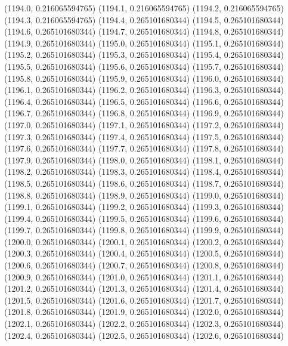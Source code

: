 {					(1194.0, 0.216065594765)
					(1194.1, 0.216065594765)
					(1194.2, 0.216065594765)
					(1194.3, 0.216065594765)
					(1194.4, 0.265101680344)
					(1194.5, 0.265101680344)
					(1194.6, 0.265101680344)
					(1194.7, 0.265101680344)
					(1194.8, 0.265101680344)
					(1194.9, 0.265101680344)
					(1195.0, 0.265101680344)
					(1195.1, 0.265101680344)
					(1195.2, 0.265101680344)
					(1195.3, 0.265101680344)
					(1195.4, 0.265101680344)
					(1195.5, 0.265101680344)
					(1195.6, 0.265101680344)
					(1195.7, 0.265101680344)
					(1195.8, 0.265101680344)
					(1195.9, 0.265101680344)
					(1196.0, 0.265101680344)
					(1196.1, 0.265101680344)
					(1196.2, 0.265101680344)
					(1196.3, 0.265101680344)
					(1196.4, 0.265101680344)
					(1196.5, 0.265101680344)
					(1196.6, 0.265101680344)
					(1196.7, 0.265101680344)
					(1196.8, 0.265101680344)
					(1196.9, 0.265101680344)
					(1197.0, 0.265101680344)
					(1197.1, 0.265101680344)
					(1197.2, 0.265101680344)
					(1197.3, 0.265101680344)
					(1197.4, 0.265101680344)
					(1197.5, 0.265101680344)
					(1197.6, 0.265101680344)
					(1197.7, 0.265101680344)
					(1197.8, 0.265101680344)
					(1197.9, 0.265101680344)
					(1198.0, 0.265101680344)
					(1198.1, 0.265101680344)
					(1198.2, 0.265101680344)
					(1198.3, 0.265101680344)
					(1198.4, 0.265101680344)
					(1198.5, 0.265101680344)
					(1198.6, 0.265101680344)
					(1198.7, 0.265101680344)
					(1198.8, 0.265101680344)
					(1198.9, 0.265101680344)
					(1199.0, 0.265101680344)
					(1199.1, 0.265101680344)
					(1199.2, 0.265101680344)
					(1199.3, 0.265101680344)
					(1199.4, 0.265101680344)
					(1199.5, 0.265101680344)
					(1199.6, 0.265101680344)
					(1199.7, 0.265101680344)
					(1199.8, 0.265101680344)
					(1199.9, 0.265101680344)
					(1200.0, 0.265101680344)
					(1200.1, 0.265101680344)
					(1200.2, 0.265101680344)
					(1200.3, 0.265101680344)
					(1200.4, 0.265101680344)
					(1200.5, 0.265101680344)
					(1200.6, 0.265101680344)
					(1200.7, 0.265101680344)
					(1200.8, 0.265101680344)
					(1200.9, 0.265101680344)
					(1201.0, 0.265101680344)
					(1201.1, 0.265101680344)
					(1201.2, 0.265101680344)
					(1201.3, 0.265101680344)
					(1201.4, 0.265101680344)
					(1201.5, 0.265101680344)
					(1201.6, 0.265101680344)
					(1201.7, 0.265101680344)
					(1201.8, 0.265101680344)
					(1201.9, 0.265101680344)
					(1202.0, 0.265101680344)
					(1202.1, 0.265101680344)
					(1202.2, 0.265101680344)
					(1202.3, 0.265101680344)
					(1202.4, 0.265101680344)
					(1202.5, 0.265101680344)
					(1202.6, 0.265101680344)
}
